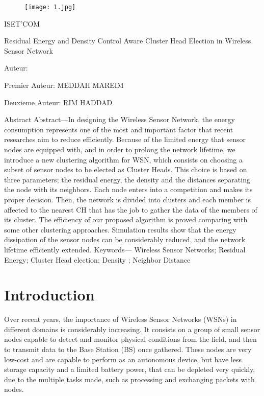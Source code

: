 \documentclass[12 pt]{report}
\begin{document}
\begin{figure}
\begin{center}
\texttt{[image: 1.jpg]}
\end{center}
\end{figure}
\center
\qquad
\Huge 
ISET'COM

\Huge\hrulefill

\center \Huge  Residual Energy and Density Control Aware Cluster
Head Election in Wireless Sensor Network

\Huge\hrulefill
\normalsize
\flushleft Auteur:                    

Premier Auteur: MEDDAH MAREIM      

Deuxieme Auteur:  RIM HADDAD      


\newpage
\center \Huge Abstract
\normalsize \flushleft 
Abstract—In designing the Wireless Sensor Network, the
energy consumption represents one of the most and important
factor that recent researches aim to reduce efficiently. Because of
the limited energy that sensor nodes are equipped with, and in
order to prolong the network lifetime, we introduce a new
clustering algorithm for WSN, which consists on choosing a
subset of sensor nodes to be elected as Cluster Heads. This choice
is based on three parameters; the residual energy, the density
and the distances separating the node with its neighbors. Each
node enters into a competition and makes its proper decision.
Then, the network is divided into clusters and each member is
affected to the nearest CH that has the job to gather the data of
the members of its cluster. The efficiency of our proposed
algorithm is proved comparing with some other clustering
approaches. Simulation results show that the energy dissipation
of the sensor nodes can be considerably reduced, and the network
lifetime efficiently extended.
\flushright Keywords— Wireless Sensor Networks; Residual Energy;
Cluster Head election; Density ; Neighbor Distance
\flushleft
\newpage 
\tableofcontents

\newpage
\chapter{Introduction}
\qquad
Over recent years, the importance of Wireless Sensor
Networks (WSNs) in different domains is considerably
increasing. It consists on a group of small sensor nodes
capable to detect and monitor physical conditions from the
field, and then to transmit data to the Base Station (BS) once
gathered. These nodes are very low-cost and are capable to
perform as an autonomous device, but have less storage
capacity and a limited battery power, that can be depleted very
quickly, due to the multiple tasks made, such as processing
and exchanging packets with nodes. 
\end{document}
